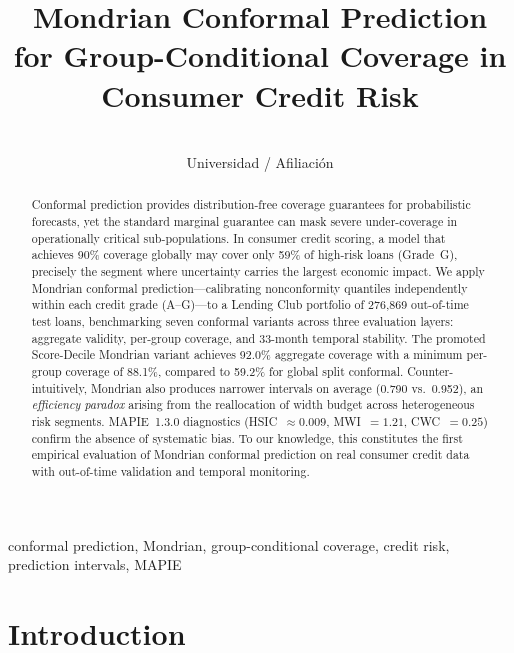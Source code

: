 \documentclass[pmlr]{jmlr}
\title[Mondrian Conformal Prediction for Group-Conditional Coverage in Consumer Credit Risk]{Mondrian Conformal Prediction for Group-Conditional Coverage in Consumer Credit Risk}
\author{%
  \Name{Carlos Vergara} \Email{carlos.vergara@example.com} \\
  \addr Universidad / Afiliaci\'{o}n %
}
\begin{document}
\maketitle

\begin{abstract}
Conformal prediction provides distribution-free coverage guarantees for
probabilistic forecasts, yet the standard marginal guarantee can mask severe
under-coverage in operationally critical sub-populations.  In consumer credit
scoring, a model that achieves 90\% coverage globally may cover only 59\% of
high-risk loans (Grade~G), precisely the segment where uncertainty carries the
largest economic impact.  We apply Mondrian conformal prediction---calibrating
nonconformity quantiles independently within each credit grade (A--G)---to a
Lending Club portfolio of 276{,}869 out-of-time test loans, benchmarking seven
conformal variants across three evaluation layers: aggregate validity,
per-group coverage, and 33-month temporal stability.  The promoted Score-Decile
Mondrian variant achieves 92.0\% aggregate coverage with a minimum per-group
coverage of 88.1\%, compared to 59.2\% for global split conformal.
Counter-intuitively, Mondrian also produces narrower intervals on average
(0.790 vs.\ 0.952), an \emph{efficiency paradox} arising from the
reallocation of width budget across heterogeneous risk segments.  MAPIE~1.3.0
diagnostics (HSIC~$\approx 0.009$, MWI~$=1.21$, CWC~$=0.25$) confirm the
absence of systematic bias.  To our knowledge, this constitutes the first
empirical evaluation of Mondrian conformal prediction on real consumer credit
data with out-of-time validation and temporal monitoring.
\end{abstract}

\begin{keywords}
conformal prediction, Mondrian, group-conditional coverage, credit risk,
prediction intervals, MAPIE
\end{keywords}

\section{Introduction}
\label{sec:introduction}
\end{document}
